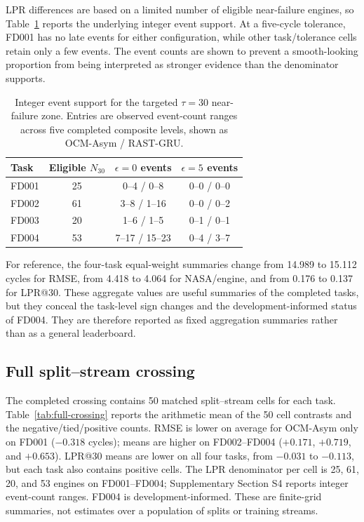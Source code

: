 \documentclass[preprint,12pt,numbers,sort&compress]{elsarticle}
\begin{document}
LPR differences are based on a limited number of eligible near-failure engines, so Table~\ref{tab:event-support} reports the underlying integer event support. At a five-cycle tolerance, FD001 has no late events for either configuration, while other task/tolerance cells retain only a few events. The event counts are shown to prevent a smooth-looking proportion from being interpreted as stronger evidence than the denominator supports.

\begin{table}[!t]
\centering
\small
\caption{Integer event support for the targeted $\tau=30$ near-failure zone. Entries are observed event-count ranges across five completed composite levels, shown as OCM-Asym / RAST-GRU.}
\label{tab:event-support}
\begin{tabular}{@{}lccc@{}}
\toprule
Task & Eligible $N_{30}$ & $\epsilon=0$ events & $\epsilon=5$ events \\
\midrule
FD001 & 25 & 0--4 / 0--8 & 0--0 / 0--0 \\
FD002 & 61 & 3--8 / 1--16 & 0--0 / 0--2 \\
FD003 & 20 & 1--6 / 1--5 & 0--1 / 0--1 \\
FD004 & 53 & 7--17 / 15--23 & 0--4 / 3--7 \\
\bottomrule
\end{tabular}
\end{table}
\FloatBarrier

For reference, the four-task equal-weight summaries change from 14.989 to 15.112 cycles for RMSE, from 4.418 to 4.064 for NASA/engine, and from 0.176 to 0.137 for LPR@30. These aggregate values are useful summaries of the completed tasks, but they conceal the task-level sign changes and the development-informed status of FD004. They are therefore reported as fixed aggregation summaries rather than as a general leaderboard.

\subsection{Full split--stream crossing}

The completed crossing contains 50 matched split--stream cells for each task. Table~\ref{tab:full-crossing} reports the arithmetic mean of the 50 cell contrasts and the negative/tied/positive counts. RMSE is lower on average for OCM-Asym only on FD001 ($-0.318$ cycles); means are higher on FD002--FD004 ($+0.171$, $+0.719$, and $+0.653$). LPR@30 means are lower on all four tasks, from $-0.031$ to $-0.113$, but each task also contains positive cells. The LPR denominator per cell is 25, 61, 20, and 53 engines on FD001--FD004; Supplementary Section S4 reports integer event-count ranges. FD004 is development-informed. These are finite-grid summaries, not estimates over a population of splits or training streams.
\end{document}
